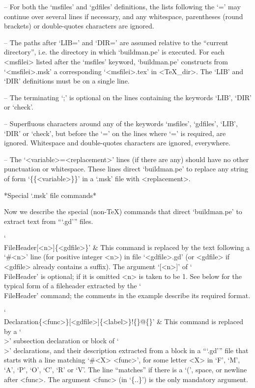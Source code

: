 \item{--}
For both the `msfiles' and `gdfiles' definitions, the lists following the
`=' may continue over several lines if  necessary,  and  any  whitespace,
parentheses (round brackets) or double-quotes characters are ignored.

\item{--}
The paths after `LIB=' and `DIR=' are assumed relative to  the  ``current
directory'', i.e. the directory in which `buildman.pe' is  executed.  For
each  <msfilei>  listed  after  the  `msfiles'   keyword,   `buildman.pe'
constructs  from  `<msfilei>.msk'  a  corresponding  `<msfilei>.tex'   in
<TeX_dir>. The `LIB' and `DIR' definitions must be on a single line.

\item{--}
The terminating `;' is optional on  the  lines  containing  the  keywords
`LIB', `DIR' or `check'.

\item{--}
Superfluous characters around any of the keywords  `msfiles',  `gdfiles',
`LIB', `DIR' or `check', but before the `=' on the  lines  where  `='  is
required,  are  ignored.  Whitespace  and  double-quotes  characters  are
ignored, everywhere.

\item{--}
The `<variable>=<replacement>' lines (if there are any)  should  have  no
other punctuation or whitespace.  These  lines  direct  `buildman.pe'  to
replace any string of form `\{\{<variable>\}\}' in  a  `.msk'  file  with
<replacement>.

\endlist

*Special `.msk' file commands*

Now  we  describe  the  special   (non-{\TeX})   commands   that   direct
`buildman.pe' to extract text from ```.gd''' files.

\beginitems

`\\FileHeader[<n>]\{<gdfile>\}' &
This command is replaced by  the  text  following  a  `\#<n>'  line  (for
positive integer <n>) in file  `<gdfile>.gd'  (or  <gdfile>  if  <gdfile>
already contains a suffix). The argument  `[<n>]'  of  `\\FileHeader'  is
optional; if it is omitted <n> is taken  to  be  1.  See  below  for  the
typical form of a fileheader extracted by the `\\FileHeader' command; the
comments in the example describe its required format.

`\\Declaration\{<func>\}[<gdfile>]\{<label>\}!\{<sub-entry>\}@\{<index-entry>\}' &
This command is replaced by a `\\>' subsection declaration  or  block  of
`\\>' declarations, and their description extracted from  a  block  in  a
```.gd''' file that starts with a line matching `\#<X> <func>', for  some
letter <X> in `F', `M',  `A',  `P',  `O',  `C',  `R'  or  `V'.  The  line
``matches'' if there is a  `(',  space,  or  newline  after  <func>.  The
argument <func> (in `\{..\}') is the only mandatory argument.

